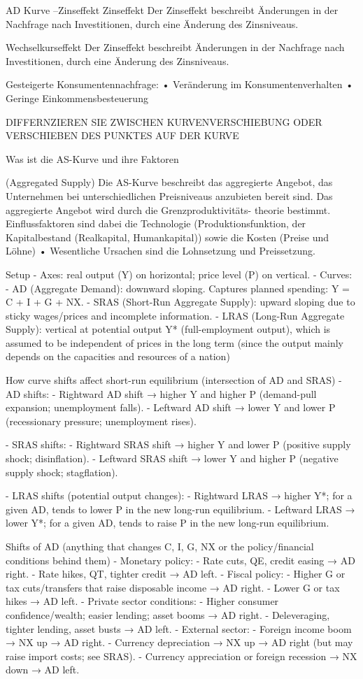 AD Kurve –Zinseffekt
Zinseffekt
Der Zinseffekt beschreibt Änderungen in der Nachfrage nach
Investitionen, durch eine Änderung des Zinsniveaus.

Wechselkurseffekt
Der Zinseffekt beschreibt Änderungen in der Nachfrage nach
Investitionen, durch eine Änderung des Zinsniveaus.

Gesteigerte Konsumentennachfrage:
• Veränderung im Konsumentenverhalten
• Geringe Einkommensbesteuerung

DIFFERNZIEREN SIE ZWISCHEN KURVENVERSCHIEBUNG
ODER VERSCHIEBEN DES PUNKTES AUF DER KURVE 

Was ist die AS-Kurve und ihre Faktoren

(Aggregated Supply)
Die AS-Kurve beschreibt das aggregierte Angebot, das
Unternehmen bei unterschiedlichen Preisniveaus anzubieten bereit
sind. Das aggregierte Angebot wird durch die Grenzproduktivitäts-
theorie bestimmt. Einflussfaktoren sind dabei die Technologie
(Produktionsfunktion, der Kapitalbestand (Realkapital,
Humankapital)) sowie die Kosten (Preise und Löhne)
• Wesentliche Ursachen sind die Lohnsetzung und Preissetzung.


Setup
- Axes: real output (Y) on horizontal; price level (P) on vertical.
- Curves:
  - AD (Aggregate Demand): downward sloping. Captures planned spending: Y = C + I + G + NX.
  - SRAS (Short-Run Aggregate Supply): upward sloping due to sticky wages/prices and incomplete information.
  - LRAS (Long-Run Aggregate Supply): vertical at potential output Y* (full-employment output), which is assumed
  to be independent of prices in the long term (since the output mainly depends on the capacities and resources of a nation)

How curve shifts affect short-run equilibrium (intersection of AD and SRAS)
- AD shifts:
  - Rightward AD shift → higher Y and higher P (demand-pull expansion; unemployment falls).
  - Leftward AD shift → lower Y and lower P (recessionary pressure; unemployment rises).

- SRAS shifts:
  - Rightward SRAS shift → higher Y and lower P (positive supply shock; disinflation).
  - Leftward SRAS shift → lower Y and higher P (negative supply shock; stagflation).

- LRAS shifts (potential output changes):
  - Rightward LRAS → higher Y*; for a given AD, tends to lower P in the new long-run equilibrium.
  - Leftward LRAS → lower Y*; for a given AD, tends to raise P in the new long-run equilibrium.

Shifts of AD (anything that changes C, I, G, NX or the policy/financial conditions behind them)
- Monetary policy:
  - Rate cuts, QE, credit easing → AD right.
  - Rate hikes, QT, tighter credit → AD left.
- Fiscal policy:
  - Higher G or tax cuts/transfers that raise disposable income → AD right.
  - Lower G or tax hikes → AD left.
- Private sector conditions:
  - Higher consumer confidence/wealth; easier lending; asset booms → AD right.
  - Deleveraging, tighter lending, asset busts → AD left.
- External sector:
  - Foreign income boom → NX up → AD right.
  - Currency depreciation → NX up → AD right (but may raise import costs; see SRAS).
  - Currency appreciation or foreign recession → NX down → AD left.

